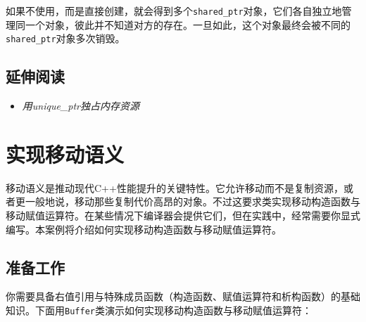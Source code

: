 
如果不使用，而是直接创建，就会得到多个\texttt{shared\_\allowbreak{}ptr}对象，它们各自独立地管理同一个对象，彼此并不知道对方的存在。一旦如此，这个对象最终会被不同的\texttt{shared\_\allowbreak{}ptr}对象多次销毁。



\subsection{延伸阅读}



\begin{itemize}
\item \textit{用unique\_ptr独占内存资源}

\end{itemize}



\section{实现移动语义}



移动语义是推动现代C++性能提升的关键特性。它允许移动而不是复制资源，或者更一般地说，移动那些复制代价高昂的对象。不过这要求类实现移动构造函数与移动赋值运算符。在某些情况下编译器会提供它们，但在实践中，经常需要你显式编写。本案例将介绍如何实现移动构造函数与移动赋值运算符。



\subsection{准备工作}



你需要具备右值引用与特殊成员函数（构造函数、赋值运算符和析构函数）的基础知识。下面用\texttt{Buffer}类演示如何实现移动构造函数与移动赋值运算符：



